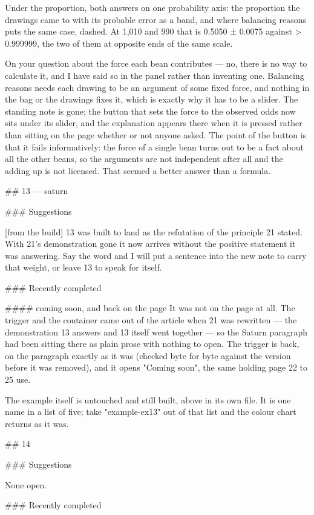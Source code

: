 Under the proportion, both answers on one probability axis: the proportion the
drawings came to with its probable error as a band, and where balancing reasons
puts the same case, dashed. At 1,010 and 990 that is 0.5050 ± 0.0075 against
> 0.999999, the two of them at opposite ends of the same scale.

On your question about the force each bean contributes — no, there is no way to
calculate it, and I have said so in the panel rather than inventing one.
Balancing reasons needs each drawing to be an argument of some fixed force, and
nothing in the bag or the drawings fixes it, which is exactly why it has to be a
slider. The standing note is gone; the button that sets the force to the observed odds
now sits under its slider, and the explanation appears there when it is pressed
rather than sitting on the page whether or not anyone asked. The point of the
button is that it fails informatively: the force of a single bean turns out to
be a fact about all the other beans, so the arguments are not independent after
all and the adding up is not licensed. That seemed a better answer than a
formula.


## 13 — saturn

### Suggestions

[from the build] 13 was built to land as the refutation of the principle 21
stated. With 21's demonstration gone it now arrives without the positive
statement it was answering. Say the word and I will put a sentence into the new
note to carry that weight, or leave 13 to speak for itself.

### Recently completed

#### coming soon, and back on the page
It was not on the page at all. The trigger and the container came out of the
article when 21 was rewritten — the demonstration 13 answers and 13 itself went
together — so the Saturn paragraph had been sitting there as plain prose with
nothing to open. The trigger is back, on the paragraph exactly as it was
(checked byte for byte against the version before it was removed), and it opens
"Coming soon", the same holding page 22 to 25 use.

The example itself is untouched and still built, above in its own file. It is
one name in a list of five; take "example-ex13" out of that list and the colour
chart returns as it was.


## 14

### Suggestions

None open.

### Recently completed

